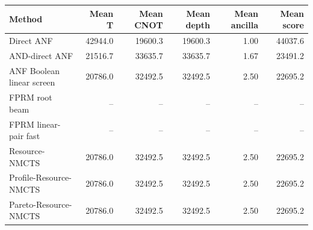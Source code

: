\begin{tabular}{lrrrrr}
\toprule
Method & Mean T & Mean CNOT & Mean depth & Mean ancilla & Mean score \\
\midrule
Direct ANF & 42944.0 & 19600.3 & 19600.3 & 1.00 & 44037.6 \\
AND-direct ANF & 21516.7 & 33635.7 & 33635.7 & 1.67 & 23491.2 \\
ANF Boolean linear screen & 20786.0 & 32492.5 & 32492.5 & 2.50 & 22695.2 \\
FPRM root beam & -- & -- & -- & -- & -- \\
FPRM linear-pair fast & -- & -- & -- & -- & -- \\
Resource-NMCTS & 20786.0 & 32492.5 & 32492.5 & 2.50 & 22695.2 \\
Profile-Resource-NMCTS & 20786.0 & 32492.5 & 32492.5 & 2.50 & 22695.2 \\
Pareto-Resource-NMCTS & 20786.0 & 32492.5 & 32492.5 & 2.50 & 22695.2 \\
\bottomrule
\end{tabular}
